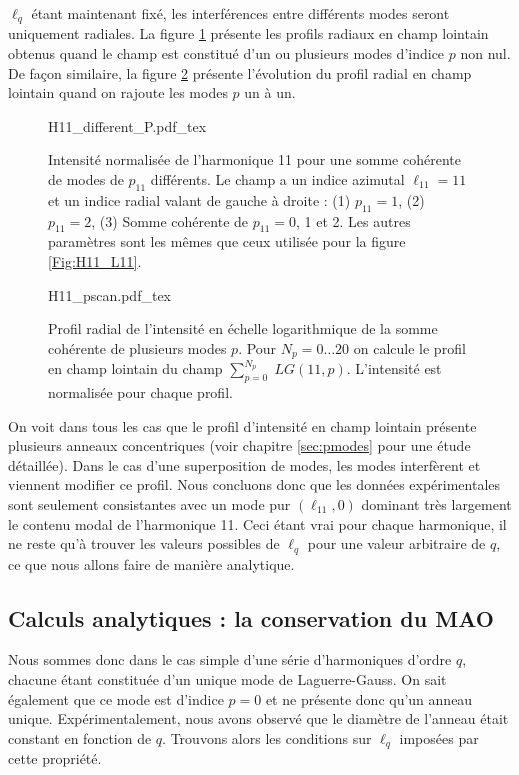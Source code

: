 $\ell_q$ étant maintenant fixé, les interférences entre différents modes seront uniquement radiales. 
La figure \ref{Fig:H11_pmodes} présente les profils radiaux en champ lointain obtenus quand le champ est constitué d'un ou plusieurs modes d'indice $p$ non nul. De façon similaire, la figure \ref{Fig:H11_pscan} présente l'évolution du profil radial en champ lointain quand on rajoute les modes $p$ un à un.


\begin{figure}[!ht]
\centering
\def\svgwidth{\columnwidth}
{H11_different_P.pdf_tex}
\caption{Intensité normalisée de l'harmonique 11 pour une somme cohérente de modes de $p_{11}$ différents. Le champ a un indice azimutal $\ell_{11} = 11$ et un indice radial valant de gauche à droite : (1) $p_{11} = 1$, (2) $p_{11} = 2$, (3) Somme cohérente de $p_{11} = 0$, 1 et 2. Les autres paramètres sont les mêmes que ceux utilisée pour la figure \ref{Fig:H11_L11}.}
\label{Fig:H11_pmodes}
\end{figure}

\begin{figure}[!ht]
\centering
\def\svgwidth{\columnwidth}
{H11_pscan.pdf_tex}
\caption{Profil radial de l'intensité en échelle logarithmique de la somme cohérente de plusieurs modes $p$. Pour $N_p=0\ldots20$ on calcule le profil en champ lointain du champ $\sum_{p=0}^{N_p}\; LG(11,p)$. L'intensité est normalisée pour chaque profil.}
\label{Fig:H11_pscan}
\end{figure}

On voit dans tous les cas que le profil d'intensité en champ lointain présente plusieurs anneaux concentriques (voir chapitre \ref{sec:pmodes} pour une étude détaillée). Dans le cas d'une superposition de modes, les modes interfèrent et viennent modifier ce profil. Nous concluons donc que les données expérimentales sont seulement consistantes avec un mode pur $(\ell_{11},0)$ dominant très largement le contenu modal de l'harmonique 11. Ceci étant vrai pour chaque harmonique, il ne reste qu'à trouver les valeurs possibles de $\ell_q$ pour une valeur arbitraire de $q$, ce que nous allons faire de manière analytique.

\subsection{Calculs analytiques : la conservation du MAO}
Nous sommes donc dans le cas simple d'une série d'harmoniques d'ordre $q$, chacune étant constituée d'un unique mode de Laguerre-Gauss. On sait également que ce mode est  d'indice $p=0$ et ne présente donc qu'un anneau unique. Expérimentalement, nous avons observé que le diamètre de l'anneau était constant en fonction de $q$. Trouvons alors les conditions sur $\ell_q$ imposées par cette propriété.\\

